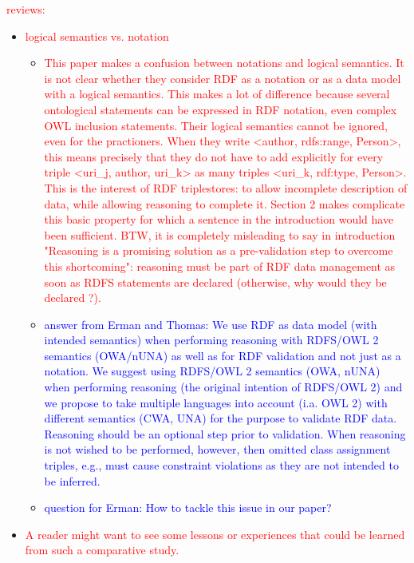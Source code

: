 \documentclass{acm_proc_article-sp}
\begin{document}
\textcolor{red}{reviews:}
\begin{itemize}
	\item \textcolor{red}{logical semantics vs. notation}
	
	\begin{itemize}
			\item 
\textcolor{red}{This paper makes a confusion between notations and logical semantics.
It is not clear whether they consider RDF as a notation or as a data model with a logical semantics.
This makes a lot of difference because several ontological statements can be expressed in RDF notation, even complex OWL inclusion statements. Their logical semantics cannot be ignored, even for the practioners.
When they write <author, rdfs:range, Person>, this means precisely that they do not have to add explicitly for every triple <uri\_j, author, uri\_k> as many triples <uri\_k, rdf:type, Person>.
This is the interest of RDF triplestores: to allow incomplete description of data, while allowing reasoning to complete it.
Section 2 makes complicate this basic property for which a sentence in the introduction would have been sufficient.
BTW, it is completely misleading to say in introduction  "Reasoning is a promising solution as a pre-validation step to overcome this shortcoming": reasoning must be part of RDF data management as soon as RDFS statements are declared (otherwise, why would they be declared ?).}
    \item \textcolor{blue}{answer from Erman and Thomas: We use RDF as data model (with intended semantics) when performing reasoning with RDFS/OWL 2 semantics (OWA/nUNA) as well as for RDF validation and not just as a notation. We suggest using RDFS/OWL 2 semantics (OWA, nUNA) when performing reasoning (the original intention of RDFS/OWL 2) and we propose to take multiple languages into account (i.a. OWL 2) with different semantics (CWA, UNA) for the purpose to validate RDF data. Reasoning should be an optional step prior to validation. When reasoning is not wished to be performed, however, then omitted class assignment triples, e.g., must cause constraint violations as they are not intended to be inferred.} 
		\item \textcolor{blue}{question for Erman: How to tackle this issue in our paper?}
\end{itemize}
	\item \textcolor{red}{A reader might want to see some lessons or experiences that could be learned from such a comparative study.}
\end{itemize}
\end{document}
